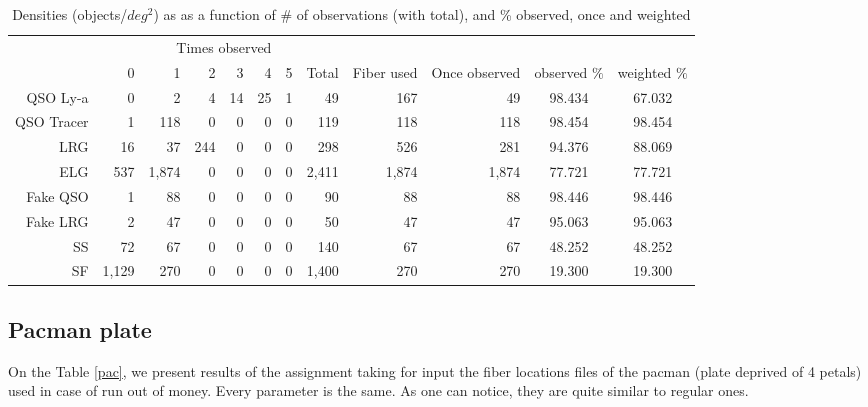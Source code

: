 \documentclass{extarticle}
\def\sqd{$deg^{2}$}
\begin{document}
\begin{table}[H]\begin{center}
\begin{tabular}{rrrrrrrrrrcc}
\hline
\multicolumn{6}{r}{Times observed} \\
	~ &           0 &     1 &  2 & 3 & 4 & 5 &  Total & Fiber used & Once observed & observed $\%$ & weighted $\%$ \\ \hline
   QSO Ly-a   &     0 &     2 &   4 & 14 & 25 & 1 &    49 &   167 &    49 & 98.434 & 67.032\\ 
 QSO Tracer   &     1 &   118 &   0 &  0 &  0 & 0 &   119 &   118 &   118 & 98.454 & 98.454\\ 
        LRG   &    16 &    37 & 244 &  0 &  0 & 0 &   298 &   526 &   281 & 94.376 & 88.069\\ 
        ELG   &   537 & 1,874 &   0 &  0 &  0 & 0 & 2,411 & 1,874 & 1,874 & 77.721 & 77.721\\ 
   Fake QSO   &     1 &    88 &   0 &  0 &  0 & 0 &    90 &    88 &    88 & 98.446 & 98.446\\ 
   Fake LRG   &     2 &    47 &   0 &  0 &  0 & 0 &    50 &    47 &    47 & 95.063 & 95.063\\ 
         SS   &    72 &    67 &   0 &  0 &  0 & 0 &   140 &    67 &    67 & 48.252 & 48.252\\ 
         SF   & 1,129 &   270 &   0 &  0 &  0 & 0 & 1,400 &   270 &   270 & 19.300 & 19.300\\ 
\hline
\end{tabular}
\caption{Densities (objects/\sqd) as as a function of \# of observations (with total), and \% observed, once and weighted}\label{res}
\end{center}\end{table}


\subsection{Pacman plate}
On the Table \ref{pac}, we present results of the assignment taking for input the fiber locations files of the pacman (plate deprived of 4 petals) used in case of run out of money. Every parameter is the same. As one can notice, they are quite similar to regular ones.
\end{document}
